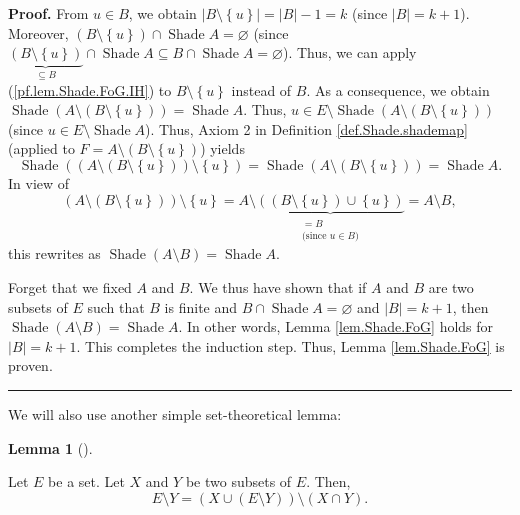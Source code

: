 \documentclass[numbers=enddot,12pt,final,onecolumn]{scrartcl}%
\theoremstyle{definition}
\newtheorem{lem}[theo]{Lemma}
\newenvironment{lemma}[1][]
{\begin{lem}[#1]\begin{leftbar}}
{\end{leftbar}\end{lem}}
\newenvironment{proof}[1][Proof]{\noindent\textbf{#1.} }{\ \rule{0.5em}{0.5em}}
\newenvironment{verlong}{}{}
\begin{document}
\begin{verlong}
\begin{proof}
From $u\in B$, we obtain $\left\vert B\setminus\left\{  u\right\}  \right\vert
=\left\vert B\right\vert -1=k$ (since $\left\vert B\right\vert =k+1$).
Moreover, $\left(  B\setminus\left\{  u\right\}  \right)  \cap
\operatorname*{Shade}A=\varnothing$ (since $\underbrace{\left(  B\setminus
\left\{  u\right\}  \right)  }_{\subseteq B}\cap\operatorname*{Shade}%
A\subseteq B\cap\operatorname*{Shade}A=\varnothing$). Thus, we can apply
(\ref{pf.lem.Shade.FoG.IH}) to $B\setminus\left\{  u\right\}  $ instead of
$B$. As a consequence, we obtain $\operatorname*{Shade}\left(  A\setminus
\left(  B\setminus\left\{  u\right\}  \right)  \right)  =\operatorname*{Shade}%
A$. Thus, $u\in E\setminus\operatorname*{Shade}\left(  A\setminus\left(
B\setminus\left\{  u\right\}  \right)  \right)  $ (since $u\in E\setminus
\operatorname*{Shade}A$). Thus, Axiom 2 in Definition \ref{def.Shade.shademap}
(applied to $F=A\setminus\left(  B\setminus\left\{  u\right\}  \right)  $)
yields
\[
\operatorname*{Shade}\left(  \left(  A\setminus\left(  B\setminus\left\{
u\right\}  \right)  \right)  \setminus\left\{  u\right\}  \right)
=\operatorname*{Shade}\left(  A\setminus\left(  B\setminus\left\{  u\right\}
\right)  \right)  =\operatorname*{Shade}A.
\]
In view of
\[
\left(  A\setminus\left(  B\setminus\left\{  u\right\}  \right)  \right)
\setminus\left\{  u\right\}  =A\setminus\underbrace{\left(  \left(
B\setminus\left\{  u\right\}  \right)  \cup\left\{  u\right\}  \right)
}_{\substack{=B\\\text{(since }u\in B\text{)}}}=A\setminus B,
\]
this rewrites as $\operatorname*{Shade}\left(  A\setminus B\right)
=\operatorname*{Shade}A$.

Forget that we fixed $A$ and $B$. We thus have shown that if $A$ and $B$ are
two subsets of $E$ such that $B$ is finite and $B\cap\operatorname*{Shade}%
A=\varnothing$ and $\left\vert B\right\vert =k+1$, then $\operatorname*{Shade}%
\left(  A\setminus B\right)  =\operatorname*{Shade}A$. In other words, Lemma
\ref{lem.Shade.FoG} holds for $\left\vert B\right\vert =k+1$. This completes
the induction step. Thus, Lemma \ref{lem.Shade.FoG} is proven.
\end{proof}
\end{verlong}

We will also use another simple set-theoretical lemma:

\begin{lemma}
\label{lem.bip.Shade-to-Bip.lem1}Let $E$ be a set. Let $X$ and $Y$ be two
subsets of $E$. Then,%
\[
E\setminus Y=\left(  X\cup\left(  E\setminus Y\right)  \right)  \setminus
\left(  X\cap Y\right)  .
\]

\end{lemma}
\end{document}
